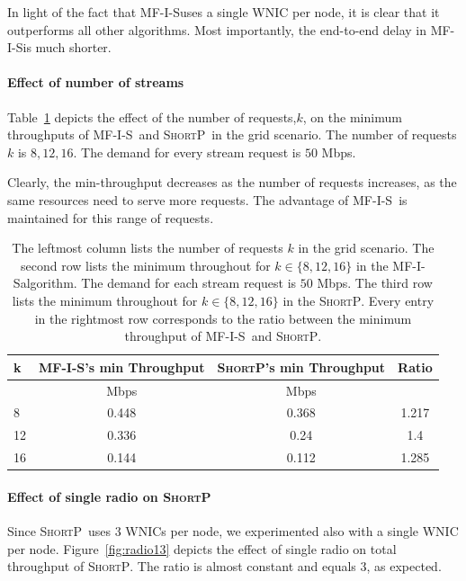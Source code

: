 \documentclass[12pt]{article}
\newenvironment{proof sketch}[1]{\noindent {\emph{Proof sketch of #1:}}}{\hfill \qed}
\newcommand{\algA}{\textsc{MF-I-S}}
\newcommand{\algB}{\textsc{ShortP}}
\newcommand{\algS}{\algB}
\begin{document}
In light of the fact that \algA uses a single WNIC per node, it is
clear that it outperforms all other algorithms. Most importantly, the
end-to-end delay in \algA is much shorter.

\paragraph{Effect of number of streams}
Table~\ref{tab:minthroughput} depicts the effect of the number of
requests,$k$, on the minimum throughputs of \algA\ and \algS\ in the
grid scenario.  The number of requests $k$ is $8,12,16$. The demand
for every stream request is $50$ Mbps.

Clearly, the min-throughput decreases as the number of requests
increases, as the same resources need to serve more requests.
The advantage of \algA\ is maintained for this range of requests.

\begin{table}
\centering\small
\begin{tabular}{|| l || c | c | c ||}

\hline
k & \algA 's min Throughput & \algS 's min Throughput & Ratio\\
\hline
& Mbps & Mbps & \\
\hline\hline
8 & 0.448 & 0.368  & 1.217  \\
12 & 0.336 & 0.24 & 1.4 \\
16 & 0.144  & 0.112 & 1.285 \\
\hline
\end{tabular}
\caption{The leftmost column lists the number of requests $k$ in the grid scenario. The second row lists the minimum throughout for $ k \in \{8,12,16\}$ in the \algA algorithm. The demand for each stream request is $50$ Mbps. The third row lists the minimum throughout for $ k \in \{8,12,16\}$ in the \algS. Every entry in the rightmost row corresponds to the ratio between the minimum throughput of \algA\ and \algS.}
\label{tab:minthroughput}
\end{table}

\paragraph{Effect of single radio on \algS}
Since \algS\ uses $3$ WNICs per node, we experimented also with a single WNIC per node.
Figure~\ref{fig:radio13} depicts the effect of single radio on total throughput of \algS.
The ratio is almost constant and equals $3$, as expected.
\end{document}
